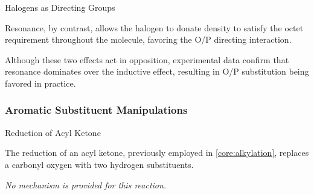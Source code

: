 \begin{core}{Halogens as Directing Groups}
\begin{enumerate}

          Resonance, by contrast, allows the halogen to donate  density to satisfy the octet requirement throughout the molecule, favoring the O/P directing interaction.

        \end{enumerate}

        Although these two effects act in opposition, experimental data confirm that resonance dominates over the inductive effect, resulting in O/P substitution being favored in practice.

      \end{core}

    \subsubsection{Aromatic Substituent Manipulations}

      \begin{core}[label=core:reduction_acyl]{Reduction of Acyl Ketone}

        The reduction of an acyl ketone, previously employed in \autoref{core:alkylation}, replaces a carbonyl oxygen with two hydrogen substituents.


        \textit{No mechanism is provided for this reaction.}

      \end{core}


